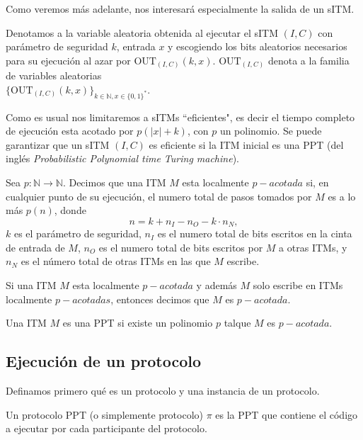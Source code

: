 Como veremos más adelante, nos interesará especialmente la salida de un sITM.

\begin{definicion}
Denotamos a la variable aleatoria obtenida al ejecutar el sITM $(I,C)$ con parámetro de seguridad $k$, entrada $x$
y escogiendo los bits aleatorios necesarios para su ejecución al azar por $\mathrm{OUT}_{(I,C)}(k, x)$.
$\mathrm{OUT}_{(I,C)}$ denota a la familia de variables aleatorias\\
$\{\mathrm{OUT}_{(I,C)}(k, x)\}_{k\in\mathbb{N}, x\in\{0,1\}^*}$.
\end{definicion}

Como es usual nos limitaremos a sITMs ``eficientes", es decir el tiempo completo
de ejecución esta acotado por $p(|x| + k)$, con $p$ un polinomio. Se puede garantizar que un sITM $(I, C)$ es
eficiente si la ITM inicial es una PPT (del inglés \textit{Probabilistic Polynomial time Turing machine}).

\begin{definicion}
Sea $p:\mathbb{N} \to \mathbb{N}$. Decimos que una ITM $M$ esta localmente $p-acotada$ si, en cualquier punto
de su ejecución, el numero total de pasos tomados por $M$ es a lo más $p(n)$, donde
$$n = k + n_I - n_O - k\cdot n_N,$$
$k$ es el parámetro de seguridad, $n_I$ es el numero total de bits escritos en la cinta de entrada de $M$,
$n_O$ es el numero total de bits escritos por $M$ a otras ITMs, y $n_N$ es el número total de otras ITMs
en las que $M$ escribe.
\end{definicion}

\begin{definicion}
Si una ITM $M$ esta localmente $p-acotada$ y además $M$ solo escribe en ITMs localmente $p-acotadas$, entonces
decimos que $M$ es $p-acotada$.
\end{definicion}

\begin{definicion}
Una ITM $M$ es una PPT si existe un polinomio $p$ talque $M$ es $p-acotada$.
\end{definicion}

\subsection{Ejecución de un protocolo}

Definamos primero qué es un protocolo y una instancia de un protocolo.

\begin{definicion}
Un protocolo PPT (o simplemente protocolo) $\pi$ es la PPT que contiene el código a ejecutar por cada
participante del protocolo.
\end{definicion}

